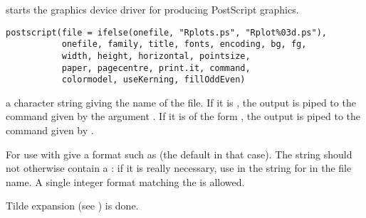 %
\begin{Description}\relax
{} starts the graphics device driver for producing
PostScript graphics.
\end{Description}
%
\begin{Usage}
\begin{verbatim}
postscript(file = ifelse(onefile, "Rplots.ps", "Rplot%03d.ps"),
           onefile, family, title, fonts, encoding, bg, fg,
           width, height, horizontal, pointsize,
           paper, pagecentre, print.it, command,
           colormodel, useKerning, fillOddEven)
\end{verbatim}
\end{Usage}
%
\begin{Arguments}
\begin{ldescription}
\item[\code{file}] a character string giving the name of the file.  If it is
, the output is piped to the command given by the argument
.
If it is of the form , the output is piped to the
command given by .

For use with  give a  format such
as  (the default in that case).  The string
should not otherwise contain a \code{\%}: if it is really necessary,
use \code{\%\%} in the string for \code{\%} in the file name.
A single integer format matching the 
 is allowed.

Tilde expansion (see ) is done.


\end{ldescription}
\end{Arguments}
